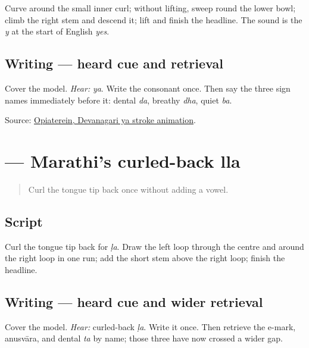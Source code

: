 \begin{quote}
\end{quote}

Curve around the small inner curl; without lifting, sweep round the lower bowl; climb the right stem and descend it; lift and finish the headline. The sound is the \emph{y} at the start of English \emph{yes}.

\subsection*{Writing — heard cue and retrieval}
Cover the model. \emph{Hear:} \emph{ya}. Write the consonant once. Then say the three sign names immediately before it: dental \emph{da}, breathy \emph{dha}, quiet \emph{ba}.

\begin{tcolorbox}[breakable,colback=teal!4,colframe=teal!35!black,title={Before you move on}]
Source: \href{https://commons.wikimedia.org/wiki/File:Deva-\%E0\%A4\%AF-order.gif}{Opiaterein, Devanagari ya stroke animation}.
\end{tcolorbox}
\section[\texorpdfstring{\mr{ळ} (ḷa)}{ळ (ḷa)}]{ — Marathi's curled-back lla}

\label{lesson:MR-W03-lla}



\begin{quote}
Curl the tongue tip back once without adding a vowel.
\end{quote}

\subsection*{Script}

\begin{quote}
\end{quote}

Curl the tongue tip back for \emph{ḷa}. Draw the left loop through the centre and around the right loop in one run; add the short stem above the right loop; finish the headline.

\subsection*{Writing — heard cue and wider retrieval}
Cover the model. \emph{Hear:} curled-back \emph{ḷa}. Write it once. Then retrieve the e-mark, anusvāra, and dental \emph{ta} by name; those three have now crossed a wider gap.

